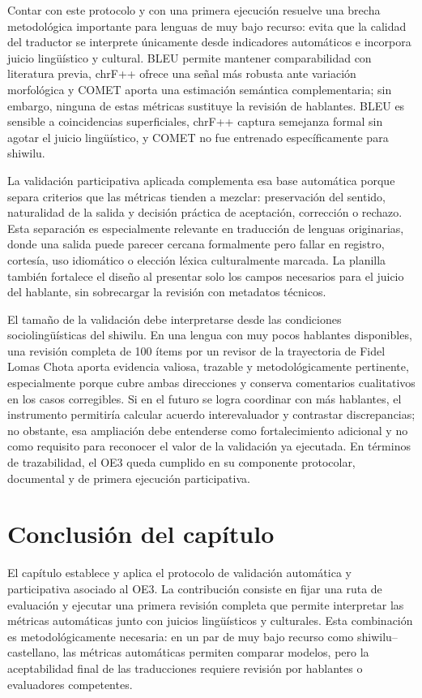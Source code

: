 \documentclass[12pt,a4paper,oneside]{book}
\begin{document}
Contar con este protocolo y con una primera ejecución resuelve una brecha metodológica importante para lenguas de muy bajo recurso: evita que la calidad del traductor se interprete únicamente desde indicadores automáticos e incorpora juicio lingüístico y cultural. BLEU permite mantener comparabilidad con literatura previa, chrF++ ofrece una señal más robusta ante variación morfológica y COMET aporta una estimación semántica complementaria; sin embargo, ninguna de estas métricas sustituye la revisión de hablantes. BLEU es sensible a coincidencias superficiales, chrF++ captura semejanza formal sin agotar el juicio lingüístico, y COMET no fue entrenado específicamente para shiwilu.

La validación participativa aplicada complementa esa base automática porque separa criterios que las métricas tienden a mezclar: preservación del sentido, naturalidad de la salida y decisión práctica de aceptación, corrección o rechazo. Esta separación es especialmente relevante en traducción de lenguas originarias, donde una salida puede parecer cercana formalmente pero fallar en registro, cortesía, uso idiomático o elección léxica culturalmente marcada. La planilla también fortalece el diseño al presentar solo los campos necesarios para el juicio del hablante, sin sobrecargar la revisión con metadatos técnicos.

El tamaño de la validación debe interpretarse desde las condiciones sociolingüísticas del shiwilu. En una lengua con muy pocos hablantes disponibles, una revisión completa de 100 ítems por un revisor de la trayectoria de Fidel Lomas Chota aporta evidencia valiosa, trazable y metodológicamente pertinente, especialmente porque cubre ambas direcciones y conserva comentarios cualitativos en los casos corregibles. Si en el futuro se logra coordinar con más hablantes, el instrumento permitiría calcular acuerdo interevaluador y contrastar discrepancias; no obstante, esa ampliación debe entenderse como fortalecimiento adicional y no como requisito para reconocer el valor de la validación ya ejecutada. En términos de trazabilidad, el OE3 queda cumplido en su componente protocolar, documental y de primera ejecución participativa.

\section{Conclusión del capítulo}\label{protocolo-conclusion-capitulo}

El capítulo establece y aplica el protocolo de validación automática y participativa asociado al OE3. La contribución consiste en fijar una ruta de evaluación y ejecutar una primera revisión completa que permite interpretar las métricas automáticas junto con juicios lingüísticos y culturales. Esta combinación es metodológicamente necesaria: en un par de muy bajo recurso como shiwilu--castellano, las métricas automáticas permiten comparar modelos, pero la aceptabilidad final de las traducciones requiere revisión por hablantes o evaluadores competentes.
\end{document}
